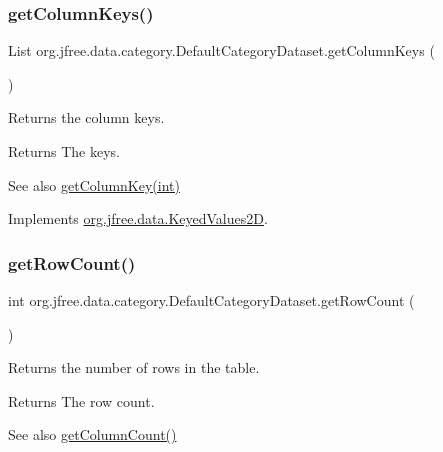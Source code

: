 \subsubsection{\texorpdfstring{get\+Column\+Keys()}{getColumnKeys()}}
{\footnotesize\ttfamily List org.\+jfree.\+data.\+category.\+Default\+Category\+Dataset.\+get\+Column\+Keys (\begin{DoxyParamCaption}{ }\end{DoxyParamCaption})}

Returns the column keys.

\begin{DoxyReturn}{Returns}
The keys.
\end{DoxyReturn}
\begin{DoxySeeAlso}{See also}
\mbox{\hyperlink{classorg_1_1jfree_1_1data_1_1category_1_1_default_category_dataset_a830798ee850da00ea96dcf29f28c70e7}{get\+Column\+Key(int)}} 
\end{DoxySeeAlso}


Implements \mbox{\hyperlink{interfaceorg_1_1jfree_1_1data_1_1_keyed_values2_d_af6b8780fee7cccdb967fc0f199398615}{org.\+jfree.\+data.\+Keyed\+Values2D}}.

\mbox{\label{classorg_1_1jfree_1_1data_1_1category_1_1_default_category_dataset_ae3c00007b8dd22c911f2cb6463508785}} 
\subsubsection{\texorpdfstring{get\+Row\+Count()}{getRowCount()}}
{\footnotesize\ttfamily int org.\+jfree.\+data.\+category.\+Default\+Category\+Dataset.\+get\+Row\+Count (\begin{DoxyParamCaption}{ }\end{DoxyParamCaption})}

Returns the number of rows in the table.

\begin{DoxyReturn}{Returns}
The row count.
\end{DoxyReturn}
\begin{DoxySeeAlso}{See also}
\mbox{\hyperlink{classorg_1_1jfree_1_1data_1_1category_1_1_default_category_dataset_a355c4edd8c94a622747aed4fcb9388a4}{get\+Column\+Count()}} 
\end{DoxySeeAlso}


